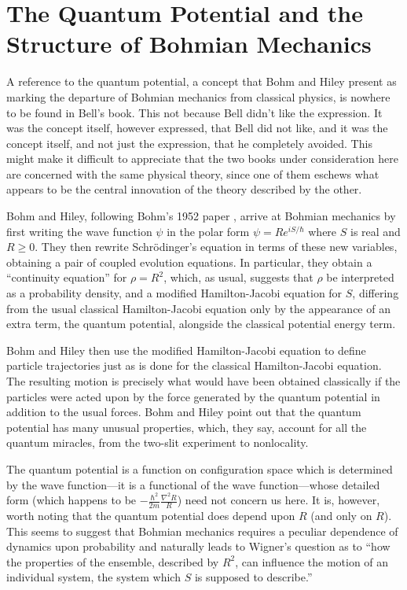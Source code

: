 \documentclass[12pt]{article}
\begin{document}
\section*{The Quantum Potential and the Structure of Bohmian Mechanics}

A reference to the quantum potential, a concept that Bohm and Hiley present
as marking the departure of Bohmian mechanics from classical physics, is
nowhere to be found in Bell's book. This not because Bell didn't like the
expression. It was the concept itself, however expressed, that Bell did not
like, and it was the concept itself, and not just the expression, that he
completely avoided.  This might make it difficult  to appreciate
that the two books under consideration here are concerned with the same
physical theory, since one of them eschews what appears to be the central
innovation of the theory described by the other.

Bohm and Hiley, following Bohm's 1952 paper \cite{Bohm52}, arrive at
Bohmian mechanics by first writing the wave function $\psi$ in the polar
form $\psi=Re^{iS/\hbar}$ where $S$ is real and $R\ge 0$. They then rewrite
Schr\"odinger's equation in terms of these new variables, obtaining a pair
of coupled evolution equations. In particular, they obtain a ``continuity
equation'' for $\rho=R^2$, which, as usual, suggests that $\rho$ be
interpreted as a probability density, and a modified Hamilton-Jacobi
equation for $S$, differing from the usual classical Hamilton-Jacobi
equation only by the appearance of an extra term, the quantum potential,
alongside the classical potential energy term.

Bohm and Hiley then use the modified Hamilton-Jacobi equation to define
particle trajectories just as is done for the classical Hamilton-Jacobi
equation. The resulting motion is precisely what would have been obtained
classically if the particles were acted upon by the force generated by the
quantum potential in addition to the usual forces. Bohm and Hiley point out
that the quantum potential has many unusual properties, which, they say,
account for all the quantum miracles, from the two-slit experiment to
nonlocality.

The quantum potential is a function on configuration space which is
determined by the wave function---it is a functional of the wave
function---whose detailed form (which happens to be
$-\frac{\hbar^2}{2m}\frac{\nabla^2R}{R}$) need not concern us here. It is,
however, worth noting that the quantum potential does depend upon $R$ (and
only on $R$). This seems to suggest that Bohmian mechanics requires a
peculiar dependence of dynamics upon probability and naturally leads to
Wigner's question \cite[page 290]{Wigner1} as to ``how the properties of
the ensemble, described by $R^2$, can influence the motion of an individual
system, the system which $S$ is supposed to describe.''
\end{document}
